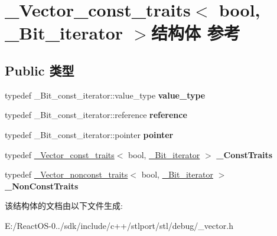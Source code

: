 \hypertarget{struct___vector__const__traits_3_01bool_00_01___bit__iterator_01_4}{}\section{\+\_\+\+Vector\+\_\+const\+\_\+traits$<$ bool, \+\_\+\+Bit\+\_\+iterator $>$结构体 参考}
\label{struct___vector__const__traits_3_01bool_00_01___bit__iterator_01_4}
\subsection*{Public 类型}
\begin{DoxyCompactItemize}
\item 
\mbox{\label{struct___vector__const__traits_3_01bool_00_01___bit__iterator_01_4_af92ee065e814194661294abad55c6e6e}} 
typedef \+\_\+\+Bit\+\_\+const\+\_\+iterator\+::value\+\_\+type {\bfseries value\+\_\+type}
\item 
\mbox{\label{struct___vector__const__traits_3_01bool_00_01___bit__iterator_01_4_af69ef9dc254cad4035476ea5e0fd34c6}} 
typedef \+\_\+\+Bit\+\_\+const\+\_\+iterator\+::reference {\bfseries reference}
\item 
\mbox{\label{struct___vector__const__traits_3_01bool_00_01___bit__iterator_01_4_a6243a15e016bd043626df4c3a7f18eec}} 
typedef \+\_\+\+Bit\+\_\+const\+\_\+iterator\+::pointer {\bfseries pointer}
\item 
\mbox{\label{struct___vector__const__traits_3_01bool_00_01___bit__iterator_01_4_a03e6d6078b528b7e6d215bdf24519869}} 
typedef \hyperlink{struct___vector__const__traits}{\+\_\+\+Vector\+\_\+const\+\_\+traits}$<$ bool, \hyperlink{struct___bit__iter}{\+\_\+\+Bit\+\_\+iterator} $>$ {\bfseries \+\_\+\+Const\+Traits}
\item 
\mbox{\label{struct___vector__const__traits_3_01bool_00_01___bit__iterator_01_4_a7207086db86b2218d31070e06cc72634}} 
typedef \hyperlink{struct___vector__nonconst__traits}{\+\_\+\+Vector\+\_\+nonconst\+\_\+traits}$<$ bool, \hyperlink{struct___bit__iter}{\+\_\+\+Bit\+\_\+iterator} $>$ {\bfseries \+\_\+\+Non\+Const\+Traits}
\end{DoxyCompactItemize}


该结构体的文档由以下文件生成\+:\begin{DoxyCompactItemize}
\item 
E\+:/\+React\+O\+S-\/0../sdk/include/c++/stlport/stl/debug/\+\_\+vector.\+h\end{DoxyCompactItemize}
